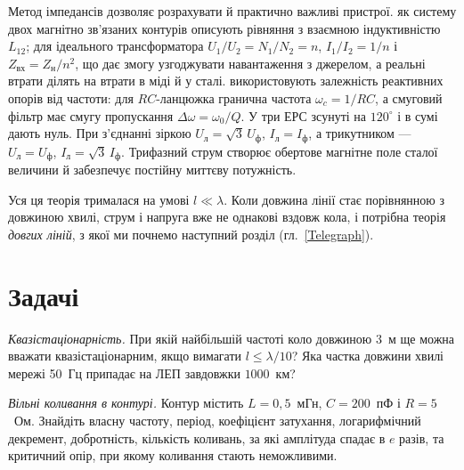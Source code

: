 Метод імпедансів дозволяє розрахувати й практично важливі пристрої.  як систему двох магнітно зв'язаних контурів описують рівняння з взаємною індуктивністю $L_{12}$; для ідеального трансформатора $U_1/U_2 = N_1/N_2 = n$, $I_1/I_2 = 1/n$ і $Z_\text{вх} = Z_\text{н}/n^2$, що дає змогу узгоджувати навантаження з джерелом, а реальні втрати ділять на втрати в міді й у сталі.  використовують залежність реактивних опорів від частоти: для $RC$-ланцюжка гранична частота $\omega_c = 1/RC$, а смуговий фільтр має смугу пропускання $\Delta\omega = \omega_0/Q$. У  три ЕРС зсунуті на $120^\circ$ і в сумі дають нуль. При з'єднанні зіркою $U_\text{л} = \sqrt3\,U_\text{ф}$, $I_\text{л} = I_\text{ф}$, а трикутником --- $U_\text{л} = U_\text{ф}$, $I_\text{л} = \sqrt3\,I_\text{ф}$. Трифазний струм створює обертове магнітне поле сталої величини й забезпечує постійну миттєву потужність.

Уся ця теорія трималася на умові $l \ll \lambda$. Коли довжина лінії стає порівнянною з довжиною хвилі, струм і напруга вже не однакові вздовж кола, і потрібна теорія \emph{довгих ліній}, з якої ми почнемо наступний розділ (гл.~\ref{Telegraph}).


\section*{Задачі}

\begin{problem}\label{prb:QuasiStationarity}
	\emph{Квазістаціонарність.} При якій найбільшій частоті коло довжиною $3$~м ще можна вважати квазістаціонарним, якщо вимагати $l\leqslant\lambda/10$? Яка частка довжини хвилі мережі 50~Гц припадає на ЛЕП завдовжки $1000$~км?
\end{problem}

\begin{problem}\label{prb:FreeOscillationsNumbers}
	\emph{Вільні коливання в контурі.} Контур містить $L=0{,}5$~мГн, $C=200$~пФ і $R=5$~Ом. Знайдіть власну частоту, період, коефіцієнт затухання, логарифмічний декремент, добротність, кількість коливань, за які амплітуда спадає в $e$ разів, та критичний опір, при якому коливання стають неможливими.
\end{problem}

